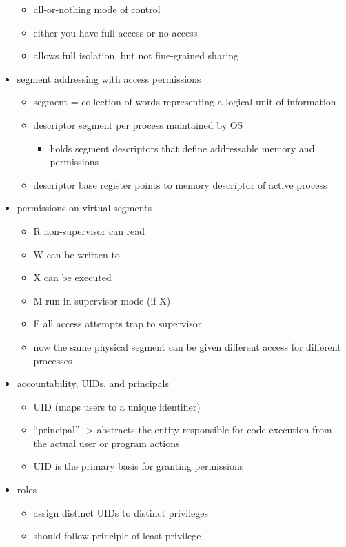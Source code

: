 \documentclass[
  12pt]{findlay}
\providecommand{\tightlist}{%
  \setlength{\itemsep}{0pt}\setlength{\parskip}{0pt}}
\begin{document}
\begin{itemize}
  \begin{itemize}
  \tightlist
  \item
    all-or-nothing mode of control
  \item
    either you have full access or no access
  \item
    allows full isolation, but not fine-grained sharing
  \end{itemize}
\item
  segment addressing with access permissions

  \begin{itemize}
  \tightlist
  \item
    segment = collection of words representing a logical unit of
    information
  \item
    descriptor segment per process maintained by OS

    \begin{itemize}
    \tightlist
    \item
      holds segment descriptors that define addressable memory and
      permissions
    \end{itemize}
  \item
    descriptor base register points to memory descriptor of active
    process
  \end{itemize}
\item
  permissions on virtual segments

  \begin{itemize}
  \tightlist
  \item
    R non-supervisor can read
  \item
    W can be written to
  \item
    X can be executed
  \item
    M run in supervisor mode (if X)
  \item
    F all access attempts trap to supervisor
  \item
    now the same physical segment can be given different access for
    different processes
  \end{itemize}
\item
  accountability, UIDs, and principals

  \begin{itemize}
  \tightlist
  \item
    UID (maps users to a unique identifier)
  \item
    ``principal'' -\textgreater{} abstracts the entity responsible for
    code execution from the actual user or program actions
  \item
    UID is the primary basis for granting permissions
  \end{itemize}
\item
  roles

  \begin{itemize}
  \tightlist
  \item
    assign distinct UIDs to distinct privileges
  \item
    should follow principle of least privilege
  \end{itemize}
\end{itemize}
\end{document}
